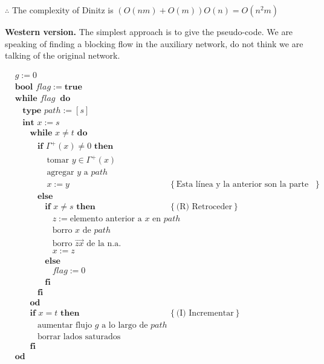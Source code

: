 \documentclass[a4paper, 12pt]{article}
\begin{document}
$\therefore $ The complexity of Dinitz is $\left( O(nm) + O(m) \right)O(n) = O(n^2m) $

\textbf{Western version.} The simplest approach is to give the pseudo-code. We
are speaking of finding a blocking flow in the auxiliary network, do not think
we are talking of the original network.

\begin{align*}
    &g := 0 \\ 
    &\textbf{bool } flag := \textbf{true} \\ 
    &\textbf{while } flag ~ \textbf{ do} \\ 
    & ~ ~ ~ ~ \textbf{type } path := [s] \\ 
    & ~ ~ ~ ~ \textbf{int } x := s \\ 
    & ~ ~ ~ ~ ~ ~ ~ ~ \textbf{while } x \neq t \textbf{ do } \\ 
    & ~ ~ ~ ~ ~ ~ ~ ~ ~ ~ ~ ~ \textbf{if } \Gamma^{+}(x) \neq 0 \textbf{ then } \\ 
    & ~ ~ ~ ~ ~ ~ ~ ~ ~ ~ ~ ~ ~ ~ ~ ~ ~ \text{tomar } y \in \Gamma^{+}(x) \\ 
    & ~ ~ ~ ~ ~ ~ ~ ~ ~ ~ ~ ~ ~ ~ ~ ~ ~ \text{agregar } y \text{ a } path \\ 
    & ~ ~ ~ ~ ~ ~ ~ ~ ~ ~ ~ ~ ~ ~ ~ ~ ~ x := y &\left\{ \text{Esta línea y la anterior son la parte (A) de avanzar} \right\}  \\ 
    & ~ ~ ~ ~ ~ ~ ~ ~ ~ ~ ~ ~ \textbf{else }  \\ 
    & ~ ~ ~ ~ ~ ~ ~ ~ ~ ~ ~ ~ ~ ~ ~ ~ \textbf{if } x \neq s \textbf{ then }  &\left\{ \text{(R) Retroceder} \right\} \\ 
    & ~ ~ ~ ~ ~ ~ ~ ~ ~ ~ ~ ~ ~ ~ ~ ~ ~ ~ ~ ~ z := \text{elemento anterior a $x$ en  } path  \\ 
    & ~ ~ ~ ~ ~ ~ ~ ~ ~ ~ ~ ~ ~ ~ ~ ~ ~ ~ ~ ~ \text{borro } x \text{ de } path\\ 
    & ~ ~ ~ ~ ~ ~ ~ ~ ~ ~ ~ ~ ~ ~ ~ ~ ~ ~ ~ ~ \text{borro } \overrightarrow{zx} \text{ de la n.a.}\\ 
    & ~ ~ ~ ~ ~ ~ ~ ~ ~ ~ ~ ~ ~ ~ ~ ~ ~ ~ ~ ~ x := z\\ 
    & ~ ~ ~ ~ ~ ~ ~ ~ ~ ~ ~ ~ ~ ~ ~ ~ \textbf{else }   \\ 
    & ~ ~ ~ ~ ~ ~ ~ ~ ~ ~ ~ ~ ~ ~ ~ ~ ~ ~ ~ ~ flag := 0   \\ 
    & ~ ~ ~ ~ ~ ~ ~ ~ ~ ~ ~ ~ ~ ~ ~ ~\textbf{fi} \\ 
    & ~ ~ ~ ~ ~ ~ ~ ~ ~ ~ ~ ~ \textbf{fi}\\
    & ~ ~ ~ ~ ~ ~ ~ ~ \textbf{od } \\
    & ~ ~ ~ ~ ~ ~ ~ ~ \textbf{if } x = t \textbf{ then } &\left\{ \text{(I) Incrementar} \right\}  \\ 
    & ~ ~ ~ ~ ~ ~ ~ ~ ~ ~ ~ ~ \text{aumentar flujo $g$ a lo largo de } path \\
    & ~ ~ ~ ~ ~ ~ ~ ~ ~ ~ ~ ~ \text{borrar lados saturados} \\ 
    & ~ ~ ~ ~ ~ ~ ~ ~ \textbf{fi}\\
    &\textbf{od}
\end{align*}
\end{document}
